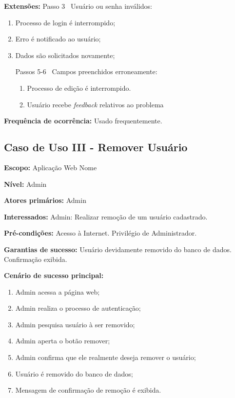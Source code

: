 \documentclass[12pt,oneside,a4paper,article]{abntex2}
\begin{document}
		\textbf{Extensões:} Passo 3 \textrightarrow \ Usuário ou senha inválidos:
		
		\begin{enumerate}[label=\alph*.]	
			\item Processo de login é interrompido;
			\item Erro é notificado ao usuário;
			\item Dados são solicitados novamente;	
			
		Passos 5-6 \textrightarrow \ Campos preenchidos erroneamente:
		
		\begin{enumerate}[label=\alph*.]	
			\item Processo de edição é interrompido.
			\item Usuário recebe \textit{feedback} relativos ao problema	
		\end{enumerate}
		
		\end{enumerate}
		
		\textbf{Frequência de ocorrência:} Usado frequentemente.
		
		\subsection{Caso de Uso III - Remover Usuário}
				
		\textbf{Escopo:} Aplicação Web Nome
		
		\textbf{Nível:} Admin
		
		\textbf{Atores primários:} Admin
		
		\textbf{Interessados:} Admin: Realizar remoção de um usuário cadastrado.
		
		\textbf{Pré-condições:} Acesso à Internet. Privilégio de Administrador.
		
		\textbf{Garantias de sucesso:} Usuário devidamente removido do banco de dados. Confirmação exibida.
		
		\textbf{Cenário de sucesso principal:}
		
		\begin{enumerate}
			\item Admin acessa a página web;
			
			\item Admin realiza o processo de autenticação;
			
			\item Admin pesquisa usuário à ser removido;
			
			\item Admin aperta o botão remover;
			
			\item Admin confirma que ele realmente deseja remover o usuário;
			
			\item Usuário é removido do banco de dados;
			
			\item Mensagem de confirmação de remoção é exibida.
			
		\end{enumerate}
		
\end{document}
